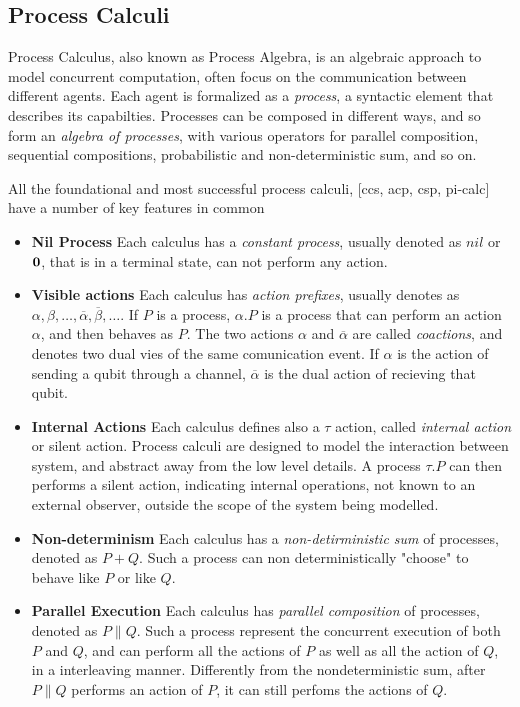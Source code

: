\subsection{Process Calculi}


Process Calculus, also known as Process Algebra, is an algebraic approach to model concurrent computation, often focus on the communication between different agents. Each agent is formalized as a \textit{process}, a syntactic element that describes its capabilties. Processes can be composed in different ways, and so form an \textit{algebra of processes}, with various operators for parallel composition, sequential compositions, probabilistic and non-deterministic sum, and so on.


All the foundational and most successful process calculi, [ccs, acp, csp, pi-calc] have a number of key features in common \begin{itemize}
\item \textbf{Nil Process} Each calculus has a \textit{constant process}, usually denoted as $nil$ or $\mathbf{0}$, that is in a terminal state, can not perform any action.
\item \textbf{Visible actions} Each calculus has \textit{action prefixes}, usually denotes as $\alpha, \beta, \ldots, \overline{\alpha}, \overline{\beta}, \ldots$. If $P$ is a process, $\alpha.P$ is a process that can perform an action $\alpha$, and then behaves as $P$. The two actions $\alpha$ and $\overline{\alpha}$ are called \textit{coactions}, and denotes two dual vies of the same comunication event. If $\alpha$ is the action of sending a qubit through a channel, $\overline{\alpha}$ is the dual action of recieving that qubit. 
\item \textbf{Internal Actions} Each calculus defines also a $\tau$ action, called \textit{internal action} or silent action. Process calculi are designed to model the interaction between system, and abstract away from the low level details. A process $\tau.P$ can then performs a silent action, indicating internal operations, not known to an external observer, outside the scope of the system being modelled. 
\item \textbf{Non-determinism} Each calculus has a \textit{non-detirministic sum} of processes, denoted as $P + Q$. Such a process can non deterministically "choose" to behave like $P$ or like $Q$. 
\item \textbf{Parallel Execution} Each calculus has \textit{parallel composition} of processes, denoted as $P \parallel Q$. Such a process represent the concurrent execution of both $P$ and $Q$, and can perform all the actions of $P$ as well as all the action of $Q$, in a interleaving manner. Differently from the nondeterministic sum, after $P\parallel Q$ performs an action of $P$, it can still perfoms the actions of $Q$.
\end{itemize}

